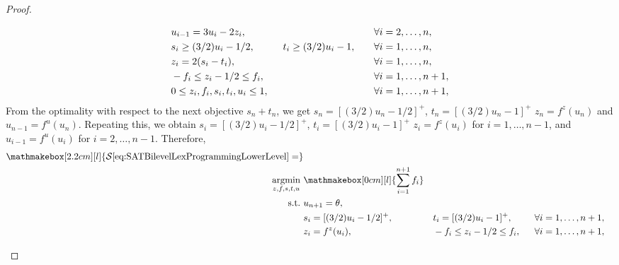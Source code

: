\documentclass[runningheads,orivec]{llncs}
\newcommand{\MacroColor}[1]{#1}
\DeclareMathOperator*{\Argmin}{\MacroColor{argmin}}
\newcommand{\NVariables}{\MacroColor{n}}
\newcommand{\OptSolSet}{\MacroColor{\mathcal{S}}}
\newcommand{\ReformZ}{\MacroColor{z}}
\newcommand{\ReformAugFrac}{\MacroColor{f}}
\newcommand{\LexLVarS}{\MacroColor{s}}
\newcommand{\LexLVarT}{\MacroColor{t}}
\newcommand{\LexLVarU}{\MacroColor{u}}
\newcommand{\LexLVarFuncU}{\MacroColor{f^u}}
\newcommand{\LexLVarFuncZ}{\MacroColor{f^z}}
\begin{document}
\begin{appendix}
\begin{proof}
\begin{enumerate}
\begin{alignat*}{3}
&
\LexLVarU_{i - 1} = 3 \LexLVarU_i - 2 z_i,
&&
&&
\forall i = 2, \ldots, \NVariables, \notag \\
&
\LexLVarS_i \ge (3/2) \LexLVarU_{i} - 1/2,
\qquad
&&
\LexLVarT_i \ge (3/2) \LexLVarU_{i} - 1,
\quad
&&
\forall i = 1, \ldots, \NVariables,
\notag \\
&
z_i = 2 (\LexLVarS_i - \LexLVarT_i),
&&
&&
\forall i = 1, \ldots, \NVariables,
\notag \\
&
-\ReformAugFrac_i \le z_i - 1/2 \le \ReformAugFrac_i, 
\quad
&&
&&
\forall i = 1, \ldots, \NVariables + 1, \notag \\
&
0 \le \ReformZ_i, \ReformAugFrac_i, \LexLVarS_i, \LexLVarT_i, \LexLVarU_i \le 1,
&&
&&
\forall i = 1, \ldots, \NVariables + 1,
\notag
\end{alignat*}
From the optimality with respect to the next objective $s_{\NVariables} + t_{\NVariables}$, we get
$\LexLVarS_{\NVariables} = [(3/2) \LexLVarU_{\NVariables} - 1/2]^+$, $\LexLVarT_{\NVariables} = [(3/2) \LexLVarU_{\NVariables} - 1]^+$ $\ReformZ_{\NVariables} = \LexLVarFuncZ(\LexLVarU_{\NVariables})$ and $\LexLVarU_{\NVariables - 1} = \LexLVarFuncU(\LexLVarU_{\NVariables})$.
Repeating this, we obtain 
$\LexLVarS_i = [(3/2) \LexLVarU_i - 1/2]^+$, $\LexLVarT_i = [(3/2) \LexLVarU_i - 1]^+$ $\ReformZ_i = \LexLVarFuncZ(\LexLVarU_i)$ for $i = 1, \ldots, \NVariables - 1$, and $\LexLVarU_{i - 1} = \LexLVarFuncU(\LexLVarU_i)$ for $i = 2, \ldots, \NVariables - 1$.
Therefore,
\begin{alignat*}{3}
\mathmakebox[2.2cm][l]{
\OptSolSet\eqref{eq:SATBilevelLexProgrammingLowerLevel} =
}
&
\\
\Argmin_{\ReformZ, \ReformAugFrac, \LexLVarS, \LexLVarT, \LexLVarU} \ & 
\mathmakebox[0cm][l]{
\sum_{i = 1}^{\NVariables + 1} \ReformAugFrac_i
}
\notag
\\
\text{s.t.} \
&
\LexLVarU_{\NVariables + 1} = \theta,
\notag
\\
&
\LexLVarS_i = [(3/2) \LexLVarU_i - 1/2]^+, 
\quad
&&
\LexLVarT_i = [(3/2) \LexLVarU_i - 1]^+,
\quad
&&
\forall i = 1, \ldots, \NVariables + 1,
\\
&
\ReformZ_i = \LexLVarFuncZ(\LexLVarU_i),
&&
-\ReformAugFrac_i \le \ReformZ_i - 1/2 \le \ReformAugFrac_i, 
\ \ 
&&
\forall i = 1, \ldots, \NVariables + 1,
\\

\end{alignat*}
\end{enumerate}
\end{proof}
\end{appendix}
\end{document}
